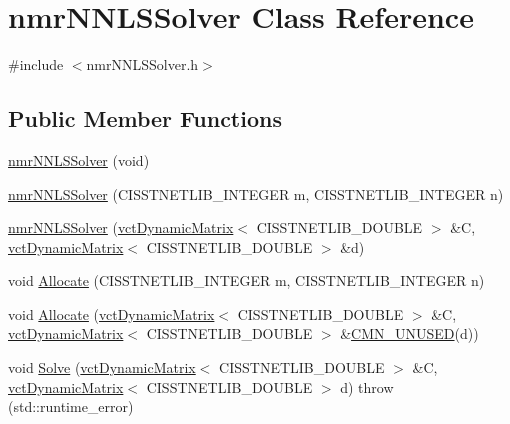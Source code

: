 \hypertarget{classnmr_n_n_l_s_solver}{\section{nmr\-N\-N\-L\-S\-Solver Class Reference}
\label{classnmr_n_n_l_s_solver}
}


{\ttfamily \#include $<$nmr\-N\-N\-L\-S\-Solver.\-h$>$}

\subsection*{Public Member Functions}
\begin{DoxyCompactItemize}
\item 
\hyperlink{classnmr_n_n_l_s_solver_ae72f26b588bf76a9796caa87e161eeaa}{nmr\-N\-N\-L\-S\-Solver} (void)
\item 
\hyperlink{classnmr_n_n_l_s_solver_aa454d78491495f93508c74282e9160cc}{nmr\-N\-N\-L\-S\-Solver} (C\-I\-S\-S\-T\-N\-E\-T\-L\-I\-B\-\_\-\-I\-N\-T\-E\-G\-E\-R m, C\-I\-S\-S\-T\-N\-E\-T\-L\-I\-B\-\_\-\-I\-N\-T\-E\-G\-E\-R n)
\item 
\hyperlink{classnmr_n_n_l_s_solver_a26bfc195a5cd11ce6613851ac7236fbb}{nmr\-N\-N\-L\-S\-Solver} (\hyperlink{classvct_dynamic_matrix}{vct\-Dynamic\-Matrix}$<$ C\-I\-S\-S\-T\-N\-E\-T\-L\-I\-B\-\_\-\-D\-O\-U\-B\-L\-E $>$ \&C, \hyperlink{classvct_dynamic_matrix}{vct\-Dynamic\-Matrix}$<$ C\-I\-S\-S\-T\-N\-E\-T\-L\-I\-B\-\_\-\-D\-O\-U\-B\-L\-E $>$ \&d)
\item 
void \hyperlink{classnmr_n_n_l_s_solver_a5894bd80cf3345464f2a8eb99f2291af}{Allocate} (C\-I\-S\-S\-T\-N\-E\-T\-L\-I\-B\-\_\-\-I\-N\-T\-E\-G\-E\-R m, C\-I\-S\-S\-T\-N\-E\-T\-L\-I\-B\-\_\-\-I\-N\-T\-E\-G\-E\-R n)
\item 
void \hyperlink{classnmr_n_n_l_s_solver_ab2caa7c0b2b789eb73c37b9a83a7a615}{Allocate} (\hyperlink{classvct_dynamic_matrix}{vct\-Dynamic\-Matrix}$<$ C\-I\-S\-S\-T\-N\-E\-T\-L\-I\-B\-\_\-\-D\-O\-U\-B\-L\-E $>$ \&C, \hyperlink{classvct_dynamic_matrix}{vct\-Dynamic\-Matrix}$<$ C\-I\-S\-S\-T\-N\-E\-T\-L\-I\-B\-\_\-\-D\-O\-U\-B\-L\-E $>$ \&\hyperlink{cmn_portability_8h_a021894e2626935fa2305434b1e893ff6}{C\-M\-N\-\_\-\-U\-N\-U\-S\-E\-D}(d))
\item 
void \hyperlink{classnmr_n_n_l_s_solver_aa1a61c6d219e030ca7d7828582a77a04}{Solve} (\hyperlink{classvct_dynamic_matrix}{vct\-Dynamic\-Matrix}$<$ C\-I\-S\-S\-T\-N\-E\-T\-L\-I\-B\-\_\-\-D\-O\-U\-B\-L\-E $>$ \&C, \hyperlink{classvct_dynamic_matrix}{vct\-Dynamic\-Matrix}$<$ C\-I\-S\-S\-T\-N\-E\-T\-L\-I\-B\-\_\-\-D\-O\-U\-B\-L\-E $>$ d)  throw (std\-::runtime\-\_\-error)

\end{DoxyCompactItemize}
